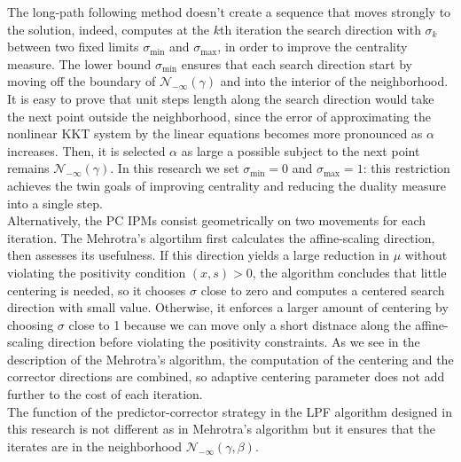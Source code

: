 \documentclass[a4paper,10 pt,titlepage,twoside]{book}
\theoremstyle{plain}
\theoremstyle{definition}
\theoremstyle{remark}
\begin{document}
The long-path following method doesn't create a sequence that moves strongly to the solution, indeed, computes at the $k$th iteration the search direction with $\sigma_{k}$ between two fixed limits $\sigma_{\text{min}}$ and $\sigma_{\text{max}}$, in order to improve the centrality measure. The lower bound $\sigma_{\text{min}}$ ensures that each search direction start by moving off the boundary of $\mathcal{N}_{-\infty}(\gamma)$ and into the interior of the neighborhood. It is easy to prove that unit steps length along the search direction would take the next point outside the neighborhood, since the error of approximating the nonlinear KKT system by the linear equations becomes more pronounced as $\alpha$ increases. Then, it is selected $\alpha$ as large a possible subject to the next point remains $\mathcal{N}_{-\infty}(\gamma)$. In this research we set $\sigma_{\text{min}}=0$ and $\sigma_{\text{max}}=1$: this restriction achieves the twin goals of improving centrality and reducing the duality measure into a single step.\\
Alternatively, the PC IPMs consist geometrically on two movements for each iteration. 
The Mehrotra's algortihm first calculates the affine-scaling direction, then assesses its usefulness. If this direction yields a large reduction in $\mu$ without violating the positivity condition $(x, s)> 0$, the algorithm concludes that little centering is needed, so it chooses $\sigma$ close to zero and computes a centered search direction with small value. Otherwise, it enforces a larger amount of centering by choosing $\sigma$ close to 1 because we can move only a short distnace along the affine-scaling direction before violating the positivity constraints. As we see in the description of the Mehrotra's algorithm, the computation of the centering and the corrector directions are combined, so adaptive centering parameter does not add further to the cost of each iteration. \\
The function of the predictor-corrector strategy in the LPF algorithm designed in this research is not different as in Mehrotra's algorithm but it ensures that the iterates are in the neighborhood $\mathcal{N}_{-\infty}(\gamma, \beta)$.
\end{document}

